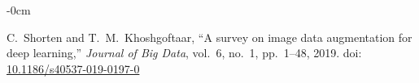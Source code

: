 \documentclass[journal,article,submit,pdftex,moreauthors]{Definitions/mdpi}
\begin{document}
\begin{adjustwidth}{-\extralength}{0cm}
{\begin{thebibliography}{999}
C.~Shorten and T.~M.~Khoshgoftaar, “A survey on image data augmentation for deep learning,” \emph{Journal of Big Data}, vol.~6, no.~1, pp.~1–48, 2019. doi: \url{10.1186/s40537-019-0197-0}

\end{thebibliography}
}

%


\end{adjustwidth}
\end{document}
